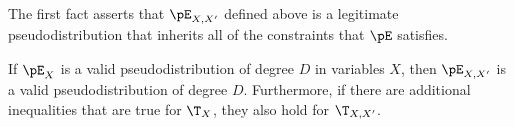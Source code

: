 The first fact asserts that $\pE_{X,X'}$ defined above is a 
legitimate pseudodistribution that inherits all of the 
constraints that $\pE$ satisfies.
\begin{fact}\label{fact:indep}
If $\pE_{X}$ is a valid pseudodistribution of degree $D$ in variables $X$, then $\pE_{X,X'} $ is a valid pseudodistribution of degree $D$. Furthermore, if there are additional \sos inequalities that are true for $\T_X$, they also hold for $\T_{X,X'}$.
\end{fact}



